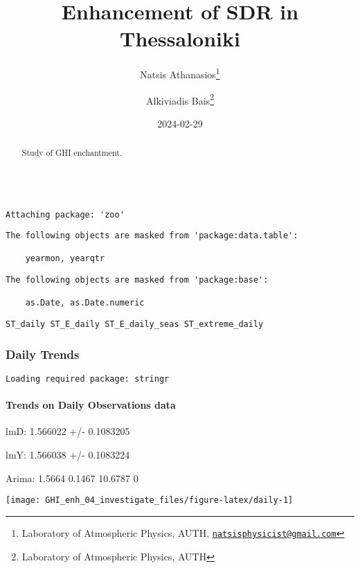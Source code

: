 \documentclass[
  10pt,
  a4paper,oneside]{article}
\title{Enhancement of SDR in Thessaloniki}
\author{Natsis Athanasios\footnote{Laboratory of Atmospheric Physics, AUTH, \href{mailto:natsisphysicist@gmail.com}{\nolinkurl{natsisphysicist@gmail.com}}} \and Alkiviadis Bais\footnote{Laboratory of Atmospheric Physics, AUTH}}
\date{2024-02-29}
\begin{document}
\maketitle
\begin{abstract}
Study of GHI enchantment.
\end{abstract}

{
\hypersetup{linkcolor=}
\setcounter{tocdepth}{4}
\tableofcontents
}
\begin{verbatim}

Attaching package: 'zoo'
\end{verbatim}

\begin{verbatim}
The following objects are masked from 'package:data.table':

    yearmon, yearqtr
\end{verbatim}

\begin{verbatim}
The following objects are masked from 'package:base':

    as.Date, as.Date.numeric
\end{verbatim}

\begin{verbatim}
ST_daily ST_E_daily ST_E_daily_seas ST_extreme_daily
\end{verbatim}

\newpage
\FloatBarrier

\hypertarget{daily-trends}{%
\subsubsection{Daily Trends}\label{daily-trends}}

\newpage

\begin{verbatim}
Loading required package: stringr
\end{verbatim}

\hypertarget{trends-on-daily-observations-data}{%
\paragraph{Trends on Daily Observations data}\label{trends-on-daily-observations-data}}

lmD: 1.566022 +/- 0.1083205

lmY: 1.566038 +/- 0.1083224

Arima: 1.5664 0.1467 10.6787 0

\begin{center}\texttt{[image: GHI\_enh\_04\_investigate\_files/figure-latex/daily-1]} \end{center}
\end{document}
